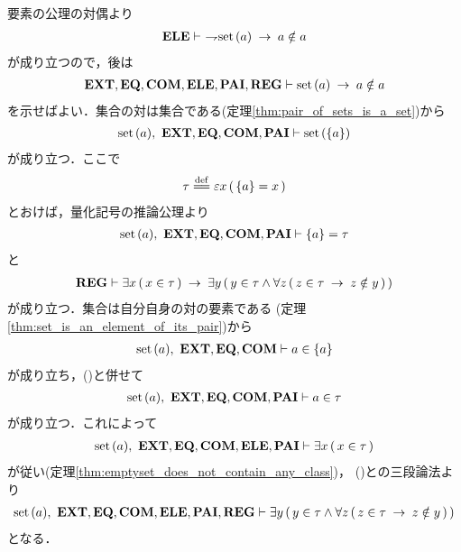 	\begin{sketch}
		要素の公理の対偶より
		\begin{align}
			\mbox{{\bf ELE}} \vdash\ \rightharpoondown\hspace{-0.25em} \operatorname*{set}\hspace{0.15em}(a) \hspace{0.25em}\rightarrow\hspace{0.25em} a \notin a
		\end{align}
		が成り立つので，後は
		\begin{align}
			\mbox{{\bf EXT}},\mbox{{\bf EQ}},\mbox{\bf COM},\mbox{{\bf ELE}},\mbox{{\bf PAI}},\mbox{{\bf REG}} 
			\vdash \operatorname*{set}\hspace{0.15em}(a) \hspace{0.25em}\rightarrow\hspace{0.25em} a \notin a
		\end{align}
		を示せばよい．集合の対は集合である(定理\ref{thm:pair_of_sets_is_a_set})から
		\begin{align}
			\operatorname*{set}\hspace{0.15em}(a),\ \mbox{{\bf EXT}},\mbox{{\bf EQ}},\mbox{\bf COM},\mbox{{\bf PAI}} \vdash \operatorname*{set}\hspace{0.15em}(\{a\})
		\end{align}
		が成り立つ．ここで
		\begin{align}
			\tau \defeq \varepsilon x\, (\, \{a\} = x\, )
		\end{align}
		とおけば，量化記号の推論公理より
		\begin{align}
			\operatorname*{set}\hspace{0.15em}(a),\ \mbox{{\bf EXT}},\mbox{{\bf EQ}},\mbox{\bf COM},\mbox{{\bf PAI}} \vdash \{a\} = \tau
			\label{fom:no_class_contains_itself_1}
		\end{align}
		と
		\begin{align}
			\mbox{{\bf REG}} \vdash \exists x\, (\, x \in \tau\, )
			\hspace{0.25em}\rightarrow\hspace{0.25em} \exists y\, (\, y \in \tau \wedge \forall z\, (\, 
			z \in \tau \hspace{0.25em}\rightarrow\hspace{0.25em} z \notin y\, )\, )
			\label{fom:no_class_contains_itself_2}
		\end{align}
		が成り立つ．集合は自分自身の対の要素である
		(定理\ref{thm:set_is_an_element_of_its_pair})から
		\begin{align}
			\operatorname*{set}\hspace{0.15em}(a),\ \mbox{{\bf EXT}},\mbox{{\bf EQ}},\mbox{\bf COM} \vdash a \in \{a\}
			\label{fom:no_class_contains_itself_3}
		\end{align}
		が成り立ち，()と併せて
		\begin{align}
			\operatorname*{set}\hspace{0.15em}(a),\ \mbox{{\bf EXT}},\mbox{{\bf EQ}},\mbox{\bf COM},\mbox{{\bf PAI}} \vdash a \in \tau
		\end{align}
		が成り立つ．これによって
		\begin{align}
			\operatorname*{set}\hspace{0.15em}(a),\ \mbox{{\bf EXT}},\mbox{{\bf EQ}},\mbox{\bf COM},\mbox{{\bf ELE}},\mbox{{\bf PAI}} \vdash 
			\exists x\, (\, x \in \tau\, )
		\end{align}
		が従い(定理\ref{thm:emptyset_does_not_contain_any_class})，
		()との三段論法より
		\begin{align}
			\operatorname*{set}\hspace{0.15em}(a),\ \mbox{{\bf EXT}},\mbox{{\bf EQ}},\mbox{\bf COM},\mbox{{\bf ELE}},\mbox{{\bf PAI}},\mbox{{\bf REG}} \vdash
			\exists y\, (\, y \in \tau \wedge \forall z\, (\, 
			z \in \tau \hspace{0.25em}\rightarrow\hspace{0.25em} z \notin y\, )\, )
		\end{align}
		となる．
		\begin{align}

\end{align}
\end{sketch}
